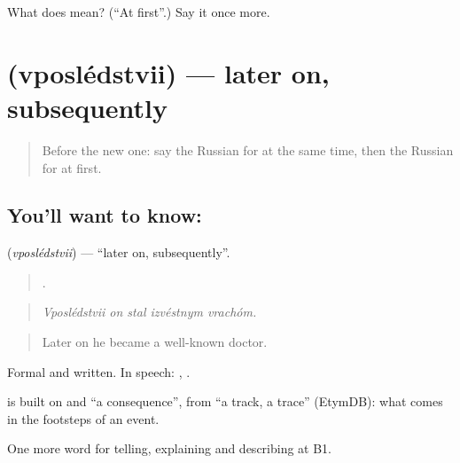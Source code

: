 \begin{tcolorbox}[breakable,colback=teal!4,colframe=teal!35!black,title={Before you move on}]
What does  mean? (\textquotedblleft{}At first\textquotedblright{}.) Say it once more.
\end{tcolorbox}
\section[\texorpdfstring{\ru{впоследствии} (vposlédstvii)}{впоследствии (vposlédstvii)}]{ (vposlédstvii) — later on, subsequently}

\label{lesson:RU-C274-vposledstvii}



\begin{quote}
Before the new one: say the Russian for at the same time, then the Russian for at first.
\end{quote}

\subsection*{You'll want to know: }
\textbf{} (\emph{vposlédstvii}) — \textquotedblleft{}later on, subsequently\textquotedblright{}.

\begin{quote}
    .
\end{quote}

\begin{quote}
\emph{Vposlédstvii on stal izvéstnym vrachóm.}
\end{quote}

\begin{quote}
Later on he became a well-known doctor.
\end{quote}

Formal and written. In speech: \emph{}, \emph{}.

\begin{cousinweb}
\emph{} is built on \emph{} and \emph{} \textquotedblleft{}a consequence\textquotedblright{}, from \emph{} \textquotedblleft{}a track, a trace\textquotedblright{} (EtymDB): what comes in the footsteps of an event.
\end{cousinweb}

\begin{grammarlens}[title={What you've built}]
One more word for telling, explaining and describing at B1.
\end{grammarlens}

